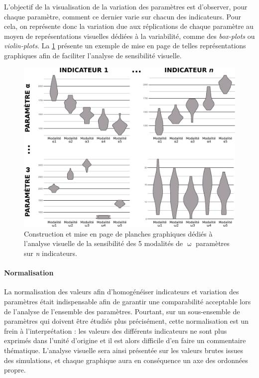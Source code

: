 L'objectif de la visualisation de la variation des paramètres est d'observer, pour chaque paramètre, comment ce dernier varie sur chacun des indicateurs.
Pour cela, on représente donc la variation due aux réplications de chaque paramètre au moyen de représentations visuelles dédiées à la variabilité, comme des \textit{box-plots} ou \textit{violin-plots}.
La \cref{fig:exemple-visu-sensib} présente un exemple de mise en page de telles représentations graphiques afin de faciliter l'analyse de sensibilité visuelle.
\begin{figure}[H]
	\centering
	\includegraphics[width=.9\linewidth]{img/schema_violinplots_sensib.pdf}
	\caption{Construction et mise en page de planches graphiques dédiés à l'analyse visuelle de la sensibilité des 5 modalités de $\upomega$ paramètres sur \textit{n} indicateurs.}
	\label{fig:exemple-visu-sensib}
\end{figure}

\paragraph{Normalisation}

La normalisation des valeurs afin d'homogénéiser indicateurs et variation des paramètres était indispensable afin de garantir une comparabilité acceptable lors de l'analyse de l'ensemble des paramètres.
Pourtant, sur un sous-ensemble de paramètres qui doivent être étudiés plus précisément, cette normalisation est un frein à l'interprétation : les valeurs des différents indicateurs ne sont plus exprimés dans l'unité d'origine et il est alors difficile d'en faire un commentaire thématique.
L'analyse visuelle sera ainsi présentée sur les valeurs brutes issues des simulations, et chaque graphique aura en conséquence un axe des ordonnées propre.

